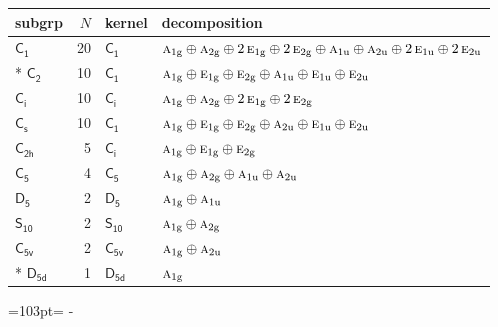 \documentclass[10pt,a4paper]{article}
\newcommand{\needspace}[1]{\par\penalty-100\begingroup\dimen0=#1\relax\dimen2=\pagegoal
  \advance\dimen2-\pagetotal\ifdim\dimen0>\dimen2\relax\ifdim\dimen2>0pt\vfil\break\fi\fi
  \endgroup}
\numberwithin{equation}{section}
\newcommand{\grp}[1]{\mathsf{#1}}
\newcommand{\irr}[1]{\text{\normalfont\scshape #1}}
\newcommand{\ptag}[1]{\mathrm{#1}}
\newlength{\fillwidth}\newlength{\cellwidth}\newlength{\colwidth}
\begin{document}
{\begin{longtable}{@{}lrl>{\RaggedRight\arraybackslash}p{\fillwidth}@{}}
subgrp & $N$ & kernel & decomposition\\\midrule\endhead
\bottomrule\endfoot\endlastfoot
\href{C1.pdf}{$\grp{C_{1}}$} & 20 & \href{C1.pdf}{$\grp{C_{1}}$} & $\irr{a}_{1\ptag{g}}\oplus \irr{a}_{2\ptag{g}}\oplus 2\,\irr{e}_{1\ptag{g}}\oplus 2\,\irr{e}_{2\ptag{g}}\oplus \irr{a}_{1\ptag{u}}\oplus \irr{a}_{2\ptag{u}}\oplus 2\,\irr{e}_{1\ptag{u}}\oplus 2\,\irr{e}_{2\ptag{u}}$\\*
\href{C2.pdf}{$\grp{C_{2}}$} & 10 & \href{C1.pdf}{$\grp{C_{1}}$} & $\irr{a}_{1\ptag{g}}\oplus \irr{e}_{1\ptag{g}}\oplus \irr{e}_{2\ptag{g}}\oplus \irr{a}_{1\ptag{u}}\oplus \irr{e}_{1\ptag{u}}\oplus \irr{e}_{2\ptag{u}}$\\
\href{S2.pdf}{$\grp{C_{i}}$} & 10 & \href{S2.pdf}{$\grp{C_{i}}$} & $\irr{a}_{1\ptag{g}}\oplus \irr{a}_{2\ptag{g}}\oplus 2\,\irr{e}_{1\ptag{g}}\oplus 2\,\irr{e}_{2\ptag{g}}$\\
\href{C1v.pdf}{$\grp{C_{s}}$} & 10 & \href{C1.pdf}{$\grp{C_{1}}$} & $\irr{a}_{1\ptag{g}}\oplus \irr{e}_{1\ptag{g}}\oplus \irr{e}_{2\ptag{g}}\oplus \irr{a}_{2\ptag{u}}\oplus \irr{e}_{1\ptag{u}}\oplus \irr{e}_{2\ptag{u}}$\\
\href{C2h.pdf}{$\grp{C_{2h}}$} & 5 & \href{S2.pdf}{$\grp{C_{i}}$} & $\irr{a}_{1\ptag{g}}\oplus \irr{e}_{1\ptag{g}}\oplus \irr{e}_{2\ptag{g}}$\\
\href{C5.pdf}{$\grp{C_{5}}$} & 4 & \href{C5.pdf}{$\grp{C_{5}}$} & $\irr{a}_{1\ptag{g}}\oplus \irr{a}_{2\ptag{g}}\oplus \irr{a}_{1\ptag{u}}\oplus \irr{a}_{2\ptag{u}}$\\
\href{D5.pdf}{$\grp{D_{5}}$} & 2 & \href{D5.pdf}{$\grp{D_{5}}$} & $\irr{a}_{1\ptag{g}}\oplus \irr{a}_{1\ptag{u}}$\\
\href{S10.pdf}{$\grp{S_{10}}$} & 2 & \href{S10.pdf}{$\grp{S_{10}}$} & $\irr{a}_{1\ptag{g}}\oplus \irr{a}_{2\ptag{g}}$\\
\href{C5v.pdf}{$\grp{C_{5v}}$} & 2 & \href{C5v.pdf}{$\grp{C_{5v}}$} & $\irr{a}_{1\ptag{g}}\oplus \irr{a}_{2\ptag{u}}$\\*
\href{D5d.pdf}{$\grp{D_{5d}}$} & 1 & \href{D5d.pdf}{$\grp{D_{5d}}$} & $\irr{a}_{1\ptag{g}}$\\
\bottomrule\end{longtable}}
\needspace{103pt}
\end{document}
